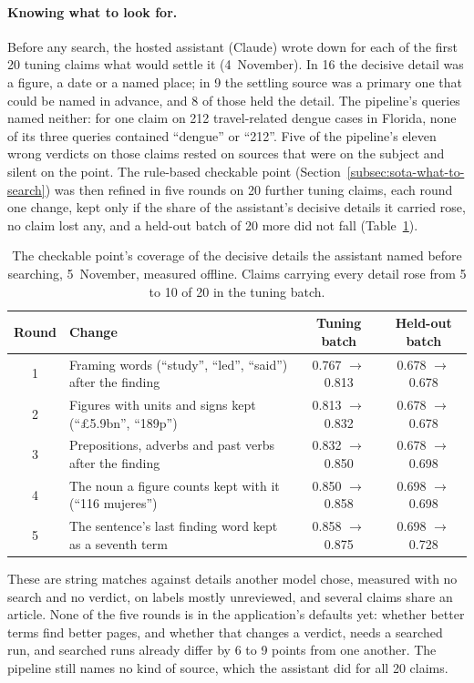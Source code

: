 \paragraph{Knowing what to look for.} Before any search, the hosted
assistant (Claude) wrote down for each of the first 20 tuning claims
what would settle it (4~November). In 16 the decisive detail was a
figure, a date or a named place; in 9 the settling source was a primary
one that could be named in advance, and 8 of those held the detail. The
pipeline's queries named neither: for one claim on 212 travel-related
dengue cases in Florida, none of its three queries contained ``dengue''
or ``212''. Five of the pipeline's eleven wrong verdicts on those claims
rested on sources that were on the subject and silent on the point. The
rule-based checkable point (Section~\ref{subsec:sota-what-to-search})
was then refined in five rounds on 20 further tuning claims, each round
one change, kept only if the share of the assistant's decisive details
it carried rose, no claim lost any, and a held-out batch of 20 more did
not fall (Table~\ref{tab:what-to-look-for}).

\begin{table}[ht]
\centering
\small
\begin{tabularx}{\linewidth}{@{}cXcc@{}}
\toprule
Round & Change & Tuning batch & Held-out batch \\
\midrule
1 & Framing words (``study'', ``led'', ``said'') after the finding & 0.767 $\to$ 0.813 & 0.678 $\to$ 0.678 \\
2 & Figures with units and signs kept (``\pounds 5.9bn'', ``189p'') & 0.813 $\to$ 0.832 & 0.678 $\to$ 0.678 \\
3 & Prepositions, adverbs and past verbs after the finding & 0.832 $\to$ 0.850 & 0.678 $\to$ 0.698 \\
4 & The noun a figure counts kept with it (``116 mujeres'') & 0.850 $\to$ 0.858 & 0.698 $\to$ 0.698 \\
5 & The sentence's last finding word kept as a seventh term & 0.858 $\to$ 0.875 & 0.698 $\to$ 0.728 \\
\bottomrule
\end{tabularx}
\caption{The checkable point's coverage of the decisive details the
assistant named before searching, 5~November, measured offline. Claims
carrying every detail rose from 5 to 10 of 20 in the tuning batch.}
\label{tab:what-to-look-for}
\end{table}

These are string matches against details another model chose, measured
with no search and no verdict, on labels mostly unreviewed, and several
claims share an article. None of the five rounds is in the application's
defaults yet: whether better terms find better pages, and whether that
changes a verdict, needs a searched run, and searched runs already
differ by 6 to 9 points from one another. The pipeline still names no
kind of source, which the assistant did for all 20 claims.
